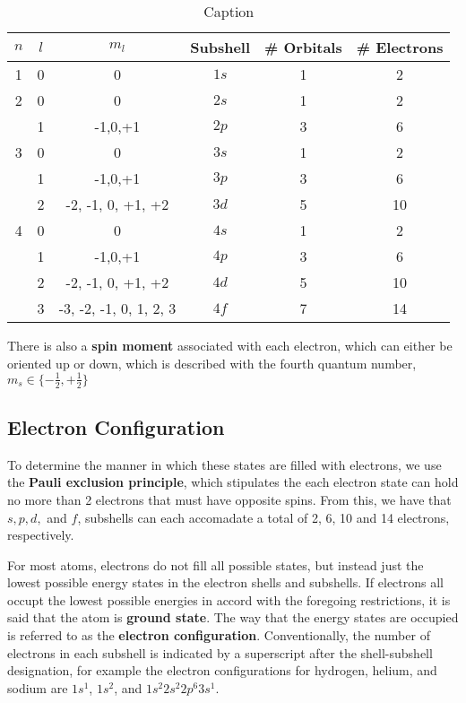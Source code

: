 \documentclass{article}
\begin{document}
\begin{table}[]
    \centering
    \begin{tabular}{|c|c|c|c|c|c|}
        \hline
        $n$ & $l$ & $m_l$ & Subshell & # Orbitals & # Electrons \\
        \hline
        \hline
         1 & 0 & 0 & $1s$ & 1 & 2 \\
         \hline
         2 & 0 & 0 & $2s$ & 1 & 2 \\
           & 1 & -1,0,+1 & $2p$ & 3 & 6 \\
         \hline
         3 & 0 & 0 & $3s$ & 1 & 2 \\
           & 1 & -1,0,+1 & $3p$ & 3 & 6 \\
           & 2 & -2, -1, 0, +1, +2 & $3d$ & 5 & 10 \\
        \hline 
        4 & 0 & 0 & $4s$ & 1 & 2 \\
           & 1 & -1,0,+1 & $4p$ & 3 & 6 \\
           & 2 & -2, -1, 0, +1, +2 & $4d$ & 5 & 10 \\
           & 3 & -3, -2, -1, 0, 1, 2, 3 & $4f$ & 7 & 14 \\
        \hline
    \end{tabular}
    \caption{Caption}
    \label{tab:summaryOfQuantumNumbers}
\end{table}

There is also a \textbf{spin moment} associated with each electron, which can either be oriented up or down, which is described with the fourth quantum number, $m_s \in \{-\frac{1}{2},+\frac{1}{2}\}$

\subsection{Electron Configuration}

To determine the manner in which these states are filled with electrons, we use the \textbf{Pauli exclusion principle}, which stipulates the each electron state can hold no more than 2 electrons that must have opposite spins. From this, we have that $s, p, d,$ and $f$, subshells can each accomadate a total of 2, 6, 10 and 14 electrons, respectively.

For most atoms, electrons do not fill all possible states, but instead just the lowest possible energy states in the electron shells and subshells. If electrons all occupt the lowest possible energies in accord with the foregoing restrictions, it is said that the atom is \textbf{ground state}. The way that the energy states are occupied is referred to as the \textbf{electron configuration}. Conventionally, the number of electrons in each subshell is indicated by a superscript after the shell-subshell designation, for example the electron configurations for hydrogen, helium, and sodium are $1s^1$, $1s^2$, and $1s^2 2s^2 2p^6 3s^1$.
\end{document}
